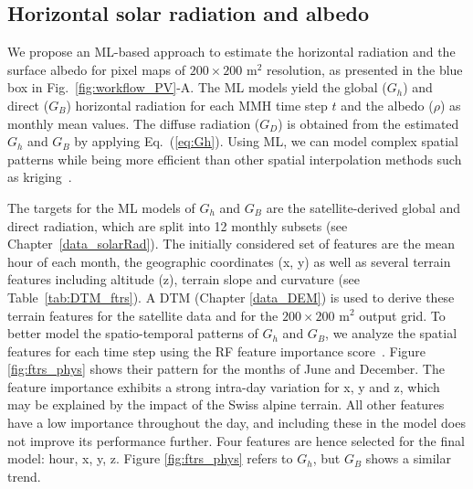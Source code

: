 \subsection{Horizontal solar radiation and albedo}
\label{irrad}

We propose an ML-based approach to estimate the horizontal radiation and the surface albedo for pixel maps of $200 \times 200$ m$^2$ resolution, as presented in the blue box in Fig.~\ref{fig:workflow_PV}-A.
The ML models yield the global ($G_h$) and direct ($G_B$) horizontal radiation for each MMH time step $t$ and the albedo ($\rho$) as monthly mean values. 
The diffuse radiation ($G_D$) is obtained from the estimated $G_h$ and $G_B$ by applying Eq.~(\ref{eq:Gh}). 
Using ML, we can model complex spatial patterns while being more efficient than other spatial interpolation methods such as kriging~\cite{rehman_spatial_2000}. 

The targets for the ML models of $G_h$ and $G_B$ are the satellite-derived global and direct radiation, which are split into 12 monthly subsets (see Chapter~\ref{data_solarRad}).
The initially considered set of features are the mean hour of each month, the geographic coordinates (x, y) as well as several terrain features including altitude (z), terrain slope and curvature \cite{robert_spatial_2012} (see Table~\ref{tab:DTM_ftrs}). 
A DTM (Chapter \ref{data_DEM}) is used to derive these terrain features for the satellite data and for the $200 \times 200$ m$^2$ output grid. 
To better model the spatio-temporal patterns of $G_h$ and $G_B$, we analyze the spatial features for each time step using the RF feature importance score~\cite{pedregosa_scikit-learn:_2011}.
Figure \ref{fig:ftrs_phys} shows their pattern for the months of June and December.
The feature importance exhibits a strong intra-day variation for x, y and z, which may be explained by the impact of the Swiss alpine terrain. All other features have a low importance throughout the day, and including these in the model does not improve its performance further.
Four features are hence selected for the final model: hour, x, y, z.
Figure \ref{fig:ftrs_phys} refers to $G_h$, but $G_B$ shows a similar trend.

